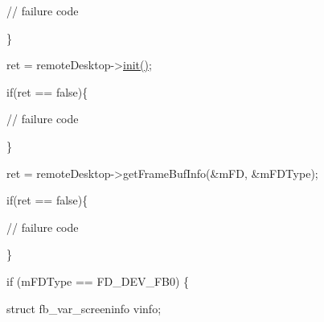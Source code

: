 \begin{DoxyPre}		 // failure code\end{DoxyPre}



\begin{DoxyPre}	 \}\end{DoxyPre}



\begin{DoxyPre}	 ret = remoteDesktop->\hyperlink{classknoxremotedesktop_1_1IRemoteDesktop_a7bed40d98c61713a69cf1dad8b37beae}{init()};\end{DoxyPre}



\begin{DoxyPre}	 if(ret == false)\{\end{DoxyPre}



\begin{DoxyPre}		 // failure code\end{DoxyPre}



\begin{DoxyPre}	 \}\end{DoxyPre}



\begin{DoxyPre}	 ret = remoteDesktop->getFrameBufInfo(&mFD, &mFDType);\end{DoxyPre}



\begin{DoxyPre}	 if(ret == false)\{\end{DoxyPre}



\begin{DoxyPre}		 // failure code\end{DoxyPre}



\begin{DoxyPre}	 \}\end{DoxyPre}



\begin{DoxyPre}	 if (mFDType == FD\_DEV\_FB0) \{\end{DoxyPre}



\begin{DoxyPre}		 struct fb\_var\_screeninfo vinfo;\end{DoxyPre}



